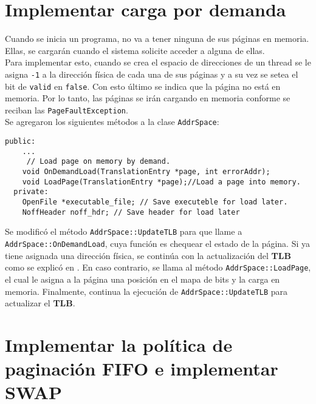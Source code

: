 \section{Implementar carga por demanda}
Cuando se inicia un programa, no va a tener ninguna de sus páginas en memoria. Ellas, se cargarán cuando el sistema solicite acceder a alguna de ellas.\\
Para implementar esto, cuando se crea el espacio de direcciones de un thread se le asigna \texttt{-{}1} a la dirección física de cada una de sus páginas y a su vez se setea el bit de \texttt{valid} en \texttt{false}. Con esto último se indica que la página no está en memoria. Por lo tanto, las páginas se irán cargando en memoria conforme se reciban las \texttt{PageFaultException}.\\
Se agregaron los siguientes métodos a la clase \texttt{AddrSpace}:
\begin{lstlisting}[style=C]
  public:
    ...
     // Load page on memory by demand.
    void OnDemandLoad(TranslationEntry *page, int errorAddr);
    void LoadPage(TranslationEntry *page);//Load a page into memory.
  private:
    OpenFile *executable_file; // Save executeble for load later.
    NoffHeader noff_hdr; // Save header for load later
\end{lstlisting}
Se modificó el método \texttt{AddrSpace::UpdateTLB} para que llame a \texttt{AddrSpace::OnDemandLoad}, cuya función es chequear el estado de la página. Si ya tiene asignada una dirección física, se continúa con la actualización del \textbf{TLB} como se explicó en . En caso contrario, se llama al método \texttt{AddrSpace::LoadPage}, el cual le asigna a la página una posición en el mapa de bits y la carga en memoria. Finalmente, continua la ejecución de \texttt{AddrSpace::UpdateTLB} para actualizar el \textbf{TLB}.
\section{Implementar la política de paginación FIFO e implementar SWAP}
